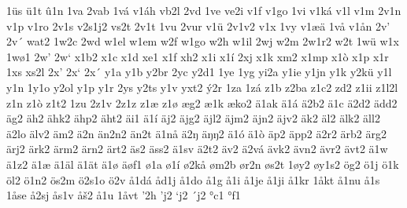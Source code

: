 1üs
ü1t
û1n
1va
2vab
1vá
v1áh
vb2l
2vd
1ve
ve2i
v1f
v1go
1vi
v1ká
v1l
v1m
2v1n
v1p
v1ro
2v1s
v2s1j2
vs2t
2v1t
1vu
2vur
v1ü
2v1v2
v1x
1vy
v1æä
1vå
v1ån
2v'
2v´
wat2
1w2c
2wd
w1el
w1em
w2f
w1go
w2h
w1il
2wj
w2m
2w1r2
w2t
1wü
w1x
1wø1
2w'
2w`
x1b2
x1c
x1d
xe1
x1f
xh2
x1i
x1í
2xj
x1k
xm2
x1mp
x1ò
x1p
x1r
1xs
xs2l
2x'
2x`
2x´
y1a
y1b
y2br
2yc
y2d1
1ye
1yg
yi2a
y1ie
y1jn
y1k
y2kü
y1l
y1n
1y1o
y2ol
y1p
y1r
2ys
y2ts
y1v
yxt2
ý2r
1za
1zá
z1b
z2ba
z1c2
zd2
z1ii
z1l2l
z1n
z1ò
z1t2
1zu
2z1v
2z1z
z1æ
z1ø
æg2
æ1k
æko2
ä1ak
ä1á
ä2b2
ä1c
ä2d2
ädd2
äg2
äh2
ähk2
ähp2
äht2
äi1
ä1í
äj2
äjg2
äjl2
äjm2
äjn2
äjv2
äk2
äl2
älk2
äll2
ä2lo
älv2
äm2
ä2n
än2n2
än2t
ä1nå
ä2ŋ
äŋŋ2
ä1ó
ä1ò
äp2
äpp2
ä2r2
ärb2
ärg2
ärj2
ärk2
ärm2
ärn2
ärt2
äs2
äss2
ä1sv
ä2t2
äv2
ä2vá
ävk2
ävn2
ävr2
ävt2
ä1w
ä1z2
ä1æ
ä1äl
ä1ät
ä1ø
äøf1
ø1a
ø1í
ø2kå
øm2b
ør2n
øs2t
1øy2
øy1s2
ög2
ö1j
ö1k
öl2
ö1n2
ös2m
ö2s1o
ö2v
å1dá
åd1j
å1do
å1g
å1i
å1je
å1ji
å1kr
1åkt
å1nu
å1s
1åse
å2sj
ås1v
åš2
å1u
1åvt
'2h
'j2
`j2
´j2
°c1
°f1
